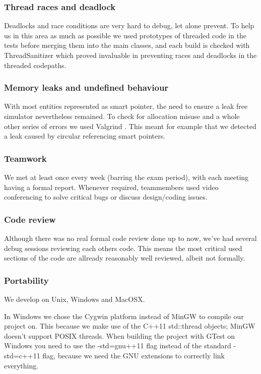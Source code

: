 \documentclass[8pt,a4paper]{report}
\begin{document}
\subsubsection{Thread races and deadlock}
Deadlocks and race conditions are very hard to debug, let alone prevent. To help us in this area as much as possible we used prototypes of threaded code in the tests before merging them into the main classes, and each build is checked with ThreadSanitizer \cite{tsan} which proved invaluable in preventing races and deadlocks in the threaded codepaths.
\subsubsection{Memory leaks and undefined behaviour}
With most entities represented as smart pointer, the need to ensure a leak free simulator nevertheless remained. To check for allocation misuse and a whole other series of errors we used Valgrind \cite{vg}. This meant for example that we detected a leak caused by circular referencing smart pointers.

\subsubsection{Teamwork}
We met at least once every week (barring the exam period), with each meeting having a formal report. Whenever required, teammembers used video conferencing to solve critical bugs or discuss design/coding issues.
\subsubsection{Code review}
Although there was no real formal code review done up to now, we've had several debug sessions reviewing each others code. This means the most critical used sections of the code are allready reasonably well reviewed, albeit not formally.
\subsubsection{Portability}
We develop on Unix, Windows and MacOSX.

In Windows we chose the Cygwin platform instead of MinGW to compile our project on. This because we make use of the C++11 std::thread objects; MinGW doesn't support POSIX threads. When building the project with GTest on Windows you need to use the -std=gnu++11 flag instead of the standard -std=c++11 flag, because we need the GNU extensions to correctly link everything.
\end{document}
